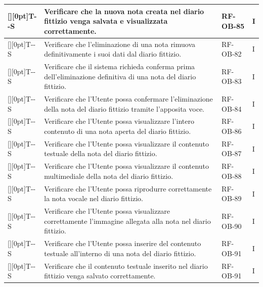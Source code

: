 \documentclass[a4paper,12pt]{article}
\newcounter{testsys}
\newcommand{\systestcode}{%
  \raisebox{0pt}[\height][0pt]{\hypertarget{T-\arabic{testsys}-S}{}}T-\arabic{testsys}-S%
}
\begin{document}
\begin{longtable}{| >{\centering\arraybackslash}p{} | >{\raggedright\arraybackslash}p{} | >{\centering\arraybackslash}p{} | >{\centering\arraybackslash}p{} |}
\stepcounter{testsys} \systestcode & Verificare che la nuova nota creata nel diario fittizio venga salvata e visualizzata correttamente. & RF-OB-85 & I \\
\hline

\stepcounter{testsys} \systestcode & Verificare che l'eliminazione di una nota rimuova definitivamente i suoi dati dal diario fittizio. & RF-OB-82 & I \\
\hline

\stepcounter{testsys} \systestcode & Verificare che il sistema richieda conferma prima dell'eliminazione definitiva di una nota del diario fittizio. & RF-OB-83 & I \\
\hline

\stepcounter{testsys} \systestcode & Verificare che l'Utente possa confermare l'eliminazione della nota del diario fittizio tramite l'apposita voce. & RF-OB-84 & I \\
\hline

\stepcounter{testsys} \systestcode & Verificare che l'Utente possa visualizzare l'intero contenuto di una nota aperta del diario fittizio. & RF-OB-86 & I \\
\hline

\stepcounter{testsys} \systestcode & Verificare che l'Utente possa visualizzare il contenuto testuale della nota del diario fittizio. & RF-OB-87 & I \\
\hline

\stepcounter{testsys} \systestcode & Verificare che l'Utente possa visualizzare il contenuto multimediale della nota del diario fittizio. & RF-OB-88 & I \\
\hline

\stepcounter{testsys} \systestcode & Verificare che l'Utente possa riprodurre correttamente la nota vocale nel diario fittizio. & RF-OB-89 & I \\
\hline

\stepcounter{testsys} \systestcode & Verificare che l'Utente possa visualizzare correttamente l'immagine allegata alla nota nel diario fittizio. & RF-OB-90 & I \\
\hline

\stepcounter{testsys} \systestcode & Verificare che l'Utente possa inserire del contenuto testuale all'interno di una nota del diario fittizio. & RF-OB-91 & I \\
\hline

\stepcounter{testsys} \systestcode & Verificare che il contenuto testuale inserito nel diario fittizio venga salvato correttamente. & RF-OB-91 & I \\
\hline


\end{longtable}
\end{document}
